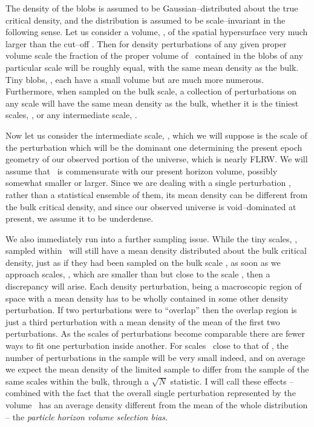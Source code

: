 \documentclass[12pt]{article}
\begin{document}
The density of the blobs is assumed to be Gaussian--distributed about
the true critical density, and the distribution
is assumed to be scale--invariant in the following sense. Let us consider
a volume, \VV, of the spatial hypersurface very much larger than the cut--off
\BB. Then for density perturbations of any given proper volume scale the
fraction of the proper volume of \VV\ contained in the blobs of any
particular scale will be roughly equal, with the same mean density as
the bulk. Tiny blobs, \TT, each have a small
volume but are much more numerous. Furthermore, when sampled
on the bulk scale, a collection of perturbations on any scale
will have the same mean density as the bulk, whether it is the tiniest
scales, \TT, or any intermediate scale, \SS.

Now let us consider the intermediate scale, \SS, which we will suppose
is the scale of the perturbation which will be the dominant one
determining the present epoch geometry of our observed portion of the
universe, which is nearly FLRW. We will assume that \SS\ is commensurate with
our present horizon volume, possibly somewhat smaller or larger.
Since we are dealing with a single perturbation \SS, rather than a
statistical ensemble of them, its mean density can be different from
the bulk critical density, and since our observed universe is
void--dominated at present, we assume it to be underdense.

We also immediately run into a further sampling issue.
While the tiny scales, \TT, sampled within \SS\ will still have
a mean density distributed about the bulk critical density, just as
if they had been sampled on the bulk scale \VV, as soon as we approach
scales, \LL, which are smaller than but close to the scale \SS, then a
discrepancy will arise. Each density perturbation, being
a macroscopic region of space with a mean density has to be wholly contained
in some other density perturbation. If two perturbations were to ``overlap''
then the overlap region is just a third perturbation with a mean density
of the mean of the first two perturbations. As the scales of perturbations
become comparable there are fewer ways to fit one perturbation inside
another. For scales
\LL\ close to that of \SS, the number of perturbations in the sample
will be very small indeed, and on average we expect the mean density of the
limited sample to differ from the sample of the same scales within the
bulk, through a $\sqrt{N}$ statistic.
I will call these effects -- combined with the fact that the overall single
perturbation represented by the volume \SS\ has an average density
different from the mean of the whole distribution -- the {\em
particle horizon volume selection bias}.
\end{document}
